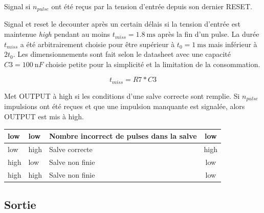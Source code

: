 \documentclass[french]{layout/Report}
\begin{document}
\begin{description}[leftmargin=!,labelwidth=4cm, labelindent=\parindent]
	\item[Down counter] Signal si $n_{pulse}$ ont été reçus par la tension d'entrée depuis son dernier RESET.
	\item[Missing pulse detector] Signal et reset le decounter après un certain délais si la tension d'entrée est maintenue \emph{high} pendant au moins $t_{miss} = \SI{1.8}{\milli\second}$ après la fin d'un pulse. La durée $t_{miss}$ a été arbitrairement choisie pour être supérieur à $t_0 = \SI{1}{\milli\second}$ mais inférieur à $2t_0$. Les dimensionnements sont fait selon le datasheet \cite{TLC555} avec une capacité $\mathit{C3} = \SI{100}{\nano F}$ choisie petite pour la simplicité et la limitation de la consommation.

		\begin{equation*}
			t_{miss} = \mathit{R7}*\mathit{C3}
		\end{equation*}

	\item[Logic] Met OUTPUT à high si les conditions d'une salve correcte sont remplie. Si $n_{pulse}$ impulsions ont été reçues et que une impulsion manquante est signalée, alors OUTPUT est mis à high. 
\end{description}

\begin{center}
    \begin{tabular}{| m{4cm} | m{4cm} | l | c |}
        \hline
        low     & low       & Nombre incorrect de pulses dans la salve & low \\ \hline
        low     & high  & Salve correcte    & high\\ \hline
        high    & low       & Salve non finie & low \\ \hline
        high    & high  & Salve non finie & low \\ \hline
    \end{tabular}
\end{center}

\subsection{Sortie}
\end{document}
